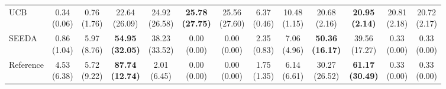 {\begin{tabular}{l|cccccc|cccccc}
UCB & \makecell{0.34 \\ (0.06)} & \makecell{0.76 \\ (1.76)} & {\cellcolor[HTML]{C8E6C9}} \makecell{22.64 \\ (26.09)} & \makecell{24.92 \\ (26.58)} & \bfseries \makecell{25.78 \\ (27.75)} & \makecell{25.56 \\ (27.60)} & \makecell{6.37 \\ (0.46)} & \makecell{10.48 \\ (1.15)} & {\cellcolor[HTML]{C8E6C9}} \makecell{20.68 \\ (2.16)} & \bfseries \makecell{20.95 \\ (2.14)} & \makecell{20.81 \\ (2.18)} & \makecell{20.72 \\ (2.17)} \\
SEEDA & \makecell{0.86 \\ (1.04)} & \makecell{5.97 \\ (8.76)} & {\cellcolor[HTML]{C8E6C9}} \bfseries \makecell{54.95 \\ (32.05)} & \makecell{38.23 \\ (33.52)} & \makecell{0.00 \\ (0.00)} & \makecell{0.00 \\ (0.00)} & \makecell{2.35 \\ (0.83)} & \makecell{7.06 \\ (4.96)} & {\cellcolor[HTML]{C8E6C9}} \bfseries \makecell{50.36 \\ (16.17)} & \makecell{39.56 \\ (17.27)} & \makecell{0.33 \\ (0.00)} & \makecell{0.33 \\ (0.00)} \\
Reference & \makecell{4.53 \\ (6.38)} & \makecell{5.72 \\ (9.22)} & {\cellcolor[HTML]{C8E6C9}} \bfseries \makecell{87.74 \\ (12.74)} & \makecell{2.01 \\ (6.45)} & \makecell{0.00 \\ (0.00)} & \makecell{0.00 \\ (0.00)} & \makecell{1.75 \\ (1.35)} & \makecell{6.14 \\ (6.61)} & {\cellcolor[HTML]{C8E6C9}} \makecell{30.27 \\ (26.52)} & \bfseries \makecell{61.17 \\ (30.49)} & \makecell{0.33 \\ (0.00)} & \makecell{0.33 \\ (0.00)} \\

\end{tabular}}
